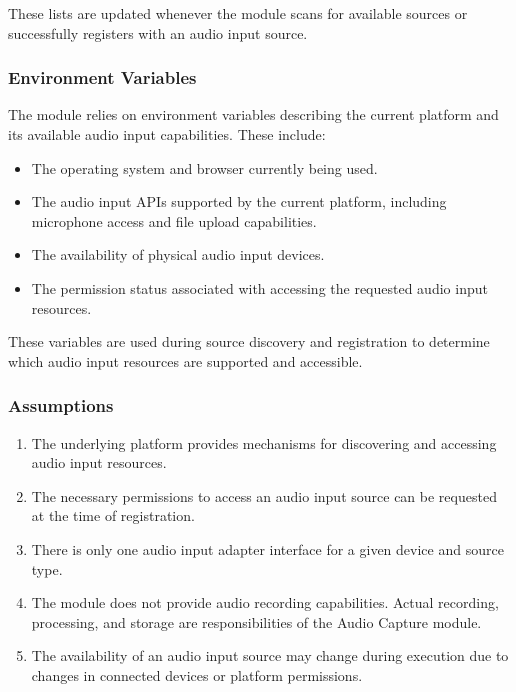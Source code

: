 \documentclass[12pt, titlepage]{article}
\begin{document}
These lists are updated whenever the module scans for available sources or successfully registers with an audio input source.

\subsubsection{Environment Variables}

The module relies on environment variables describing the current platform and its available audio input capabilities. These include:

\begin{itemize}
    \item The operating system and browser currently being used.
    \item The audio input APIs supported by the current platform, including microphone access and file upload capabilities.
    \item The availability of physical audio input devices.
    \item The permission status associated with accessing the requested audio input resources.
\end{itemize}

These variables are used during source discovery and registration to determine which audio input resources are supported and accessible.

\subsubsection{Assumptions}

\begin{enumerate}
    \item The underlying platform provides mechanisms for discovering and accessing audio input resources.
    \item The necessary permissions to access an audio input source can be requested at the time of registration.
    \item There is only one audio input adapter interface for a given device and source type.
    \item The module does not provide audio recording capabilities. Actual recording, processing, and storage are responsibilities of the Audio Capture module.
    \item The availability of an audio input source may change during execution due to changes in connected devices or platform permissions.
\end{enumerate}
\end{document}
